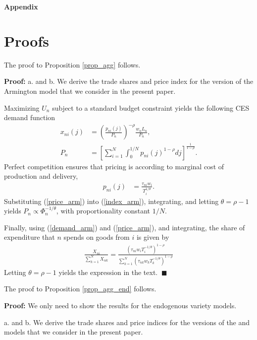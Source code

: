 \documentclass[12pt,dvips, ps2pdf]{article}
\begin{document}
\begin{appendix}

\centerline{\Large \textbf{Appendix}}

\section{Proofs}

The proof to Proposition \ref{prop_agg} follows.

\textbf{Proof:} a. and b. We derive the trade shares and price index for the version of the Armington model that we consider in the present paper.

Maximizing $U_n$ subject to a standard budget constraint yields the following CES demand function
\begin{align}
x_{ni}(j)&=\left(\frac{p_{ni}(j)}{P_n}\right)^{-\rho}\frac{w_nL_n}{P_n},\label{demand_arm}\\
P_n&=\left[\sum_{i=1}^N\int_{0}^{1/N}p_{ni}(j)^{1-\rho}dj\right]^\frac{1}{1-\rho}.\label{index_arm}
\end{align}
Perfect competition ensures that pricing is according to marginal cost of production and delivery,
\begin{align}
p_{ni}(j)&=\frac{\tau_{ni}w_i}{T_i^{1/\theta}}.\label{price_arm}
\end{align}
Substituting (\ref{price_arm}) into (\ref{index_arm}), integrating, and letting $\theta=\rho-1$ yields $P_n\propto \Phi_{n}^{-1/\theta}$, with proportionality constant $1/N$.

Finally, using (\ref{demand_arm}) and (\ref{price_arm}), and integrating, the share of expenditure that $n$ spends on goods from $i$ is given by
 \begin{align}
\frac{X_{ni}}{\sum_{k=1}^NX_{nk}}=\frac{\left(\tau_{ni}w_iT_i^{-1/\theta}\right)^{1-\rho}}{\sum_{k=1}^N\left(\tau_{nk}w_kT_k^{-1/\theta}\right)^{1-\rho}}\label{share_arm}
\end{align}
Letting $\theta=\rho-1$ yields the expression in the text. $\ \blacksquare$

The proof to Proposition \ref{prop_agg_end} follows.

\textbf{Proof:} We only need to show the results for the endogenous variety models.

a. and b. We derive the trade shares and price indices for the versions of the \citet{krug80} and \citet{mel03} models that we consider in the present paper.


\end{appendix}
\end{document}
